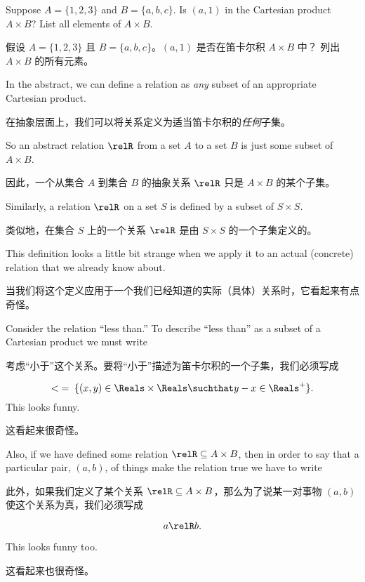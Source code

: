 \begin{exer}
Suppose $A = \{1,2,3\}$ and $B = \{a,b,c\}$.  Is $(a,1)$ in the Cartesian
product $A \times B$?
List all elements of $A \times B$.
\end{exer} 

\begin{exer}
假设 $A = \{1,2,3\}$ 且 $B = \{a,b,c\}$。$(a,1)$ 是否在笛卡尔积 $A \times B$ 中？
列出 $A \times B$ 的所有元素。
\end{exer}

In the abstract, we can define a relation as \emph{any} subset of an
appropriate Cartesian product.

在抽象层面上，我们可以将关系定义为适当笛卡尔积的\emph{任何}子集。

So an abstract relation $\relR$ from a set 
$A$ to a set $B$ is just some subset of $A \times B$.

因此，一个从集合 $A$ 到集合 $B$ 的抽象关系 $\relR$ 只是 $A \times B$ 的某个子集。

Similarly, a
relation $\relR$ on a set $S$ is defined by a subset of $S \times S$.

类似地，在集合 $S$ 上的一个关系 $\relR$ 是由 $S \times S$ 的一个子集定义的。

This definition looks a little bit strange when we apply it to an
actual (concrete) relation that we already know about.

当我们将这个定义应用于一个我们已经知道的实际（具体）关系时，它看起来有点奇怪。

Consider the
relation ``less than.''   To describe ``less than'' as a subset of
a Cartesian product we must write

考虑“小于”这个关系。要将“小于”描述为笛卡尔积的一个子集，我们必须写成

\[ < \;
= \; \{ (x,y) \in \Reals \times \Reals \suchthat y-x \in \Reals^+ \}.\] 
\noindent This looks funny.

\noindent 这看起来很奇怪。

Also, if we have defined some relation $\relR \subseteq A \times B$, then in order
to say that a particular pair, $(a,b)$, of things make the relation true we
have to write 

此外，如果我们定义了某个关系 $\relR \subseteq A \times B$，那么为了说某一对事物 $(a,b)$ 使这个关系为真，我们必须写成

\[ a\relR b.
\]

\noindent This looks funny too.  

\noindent 这看起来也很奇怪。

